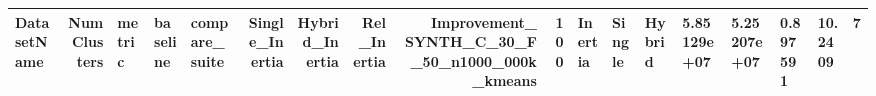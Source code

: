 \begin{tabular}{lrlllrrrrr}
\toprule
DatasetName & NumClusters & metric & baseline & compare_suite & Single_Inertia & Hybrid_Inertia & Rel_Inertia & Improvement_%
\midrule
SYNTH_C_30_F_50_n1000_000k_kmeans & 100 & Inertia & Single & Hybrid & 5.85129e+07 & 5.25207e+07 & 0.897591 & 10.2409 & 7 \\
\bottomrule
\end{tabular}
